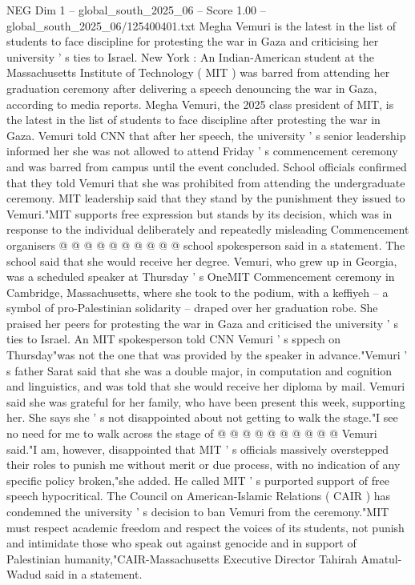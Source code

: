 \begin{textsample}{NEG Dim 1 – global\_south\_2025\_06 – Score 1.00 – global\_south\_2025\_06/125400401.txt}  \label{ex:f1_neg_311}
Megha Vemuri is the latest in the list of students to face discipline for protesting the war in Gaza and criticising her university ' s ties to Israel.
New York : An Indian-American student at the Massachusetts Institute of Technology ( MIT ) was barred from attending her graduation ceremony after delivering a speech denouncing the war in Gaza, according to media reports.
Megha Vemuri, the 2025 class president of MIT, is the latest in the list of students to face discipline after protesting the war in Gaza.
Vemuri told CNN that after her speech, the university ' s senior leadership informed her she was not allowed to attend Friday ' s commencement ceremony and was barred from campus until the event concluded.
School officials confirmed that they told Vemuri that she was prohibited from attending the undergraduate ceremony.
MIT leadership said that they stand by the punishment they issued to Vemuri."MIT supports free expression but stands by its decision, which was in response to the individual deliberately and repeatedly misleading Commencement organisers @ @ @ @ @ @ @ @ @ @ school spokesperson said in a statement.
The school said that she would receive her degree.
Vemuri, who grew up in Georgia, was a scheduled speaker at Thursday ' s OneMIT Commencement ceremony in Cambridge, Massachusetts, where she took to the podium, with a keffiyeh -- a symbol of pro-Palestinian solidarity -- draped over her graduation robe.
She praised her peers for protesting the war in Gaza and criticised the university ' s ties to Israel.
An MIT spokesperson told CNN Vemuri ' s sppech on Thursday"was not the one that was provided by the speaker in advance."Vemuri ' s father Sarat said that she was a double major, in computation and cognition and linguistics, and was told that she would receive her diploma by mail.
Vemuri said she was grateful for her family, who have been present this week, supporting her.
She says she ' s not disappointed about not getting to walk the stage."I see no need for me to walk across the stage of @ @ @ @ @ @ @ @ @ @ Vemuri said."I am, however, disappointed that MIT ' s officials massively overstepped their roles to punish me without merit or due process, with no indication of any specific policy broken,"she added.
He called MIT ' s purported support of free speech hypocritical.
The Council on American-Islamic Relations ( CAIR ) has condemned the university ' s decision to ban Vemuri from the ceremony."MIT must respect academic freedom and respect the voices of its students, not punish and intimidate those who speak out against genocide and in support of Palestinian humanity,"CAIR-Massachusetts Executive Director Tahirah Amatul-Wadud said in a statement.

\end{textsample}
